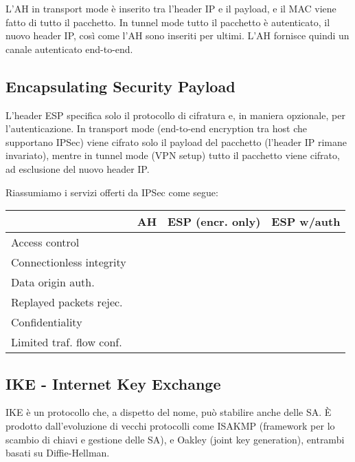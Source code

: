 \documentclass[a4paper, 10pt, twoside]{article}
\begin{document}
	L'AH in transport mode è inserito tra l'header IP e il payload, e il MAC viene fatto di tutto il pacchetto. In tunnel mode tutto il pacchetto è autenticato, il nuovo header IP, così come l'AH sono inseriti per ultimi. L'AH fornisce quindi un canale autenticato end-to-end.

	\subsection{Encapsulating Security Payload}
	L'header ESP specifica solo il protocollo di cifratura e, in maniera opzionale, per l'autenticazione.
	In transport mode (end-to-end encryption tra host che supportano IPSec) viene cifrato solo il payload del pacchetto (l'header IP rimane invariato), mentre in tunnel mode (VPN setup) tutto il pacchetto viene cifrato, ad esclusione del nuovo header IP.

	Riassumiamo i servizi offerti da IPSec come segue:\\
	\vspace{0.5cm}

	\begin{center}	
		\begin{tabular}{lccc}
			\toprule
			& \textbf{AH} & \textbf{ESP (encr. only)} & \textbf{ESP w/auth} \\
			\midrule
			Access control & \checkmark & \checkmark & \checkmark \\
			Connectionless integrity & \checkmark & & \checkmark \\
			Data origin auth. & \checkmark & & \checkmark \\
			Replayed packets rejec. & \checkmark & \checkmark & \checkmark \\
			Confidentiality & & \checkmark & \checkmark \\
			Limited traf. flow conf. & & \checkmark & \checkmark \\
			\bottomrule
		\end{tabular}
	\end{center}

	\subsection{IKE - Internet Key Exchange}
	IKE è un protocollo che, a dispetto del nome, può stabilire anche delle SA. È prodotto dall'evoluzione di vecchi protocolli come ISAKMP (framework per lo scambio di chiavi e gestione delle SA), e Oakley (joint key generation), entrambi basati su Diffie-Hellman.
\end{document}
